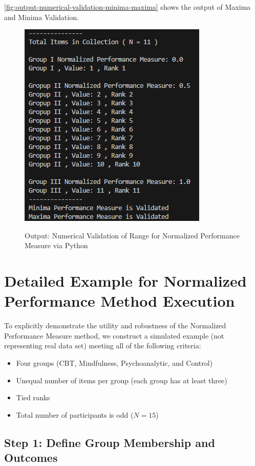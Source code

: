 \documentclass[a4paper,fleqn,review]{cas-sc}
\begin{document}
\autoref{fig:output-numerical-validation-minima-maxima} shows the output of Maxima and Minima Validation.
\begin{figure}
	\caption{Output: Numerical Validation of Range for Normalized Performance Measure via Python}
	\centering
	\includegraphics [scale=1]{output-validation-minima-maxima.png}
	\label{fig:output-numerical-validation-minima-maxima}
\end{figure}


\section{Detailed Example for Normalized Performance Method Execution}

To explicitly demonstrate the utility and robustness of the Normalized Performance Measure method, we construct a simulated example (not representing real data set) meeting all of the following criteria:

\begin{itemize}
	\item Four groups (CBT, Mindfulness, Psychoanalytic, and Control)
	\item Unequal number of items per group (each group has at least three)
	\item Tied ranks
	\item Total number of participants is odd ($N = 15$)
\end{itemize}

\vspace{1em}

\subsection*{Step 1: Define Group Membership and Outcomes}
\end{document}
